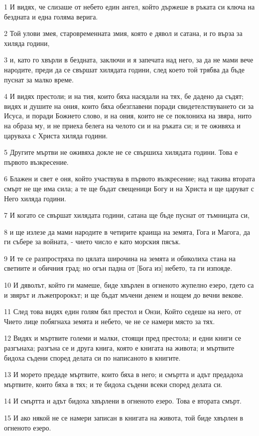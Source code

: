 \par 1 И видях, че слизаше от небето един ангел, който държеше в ръката си ключа на бездната и една голяма верига.
\par 2 Той улови змея, старовременната змия, която е дявол и сатана, и го върза за хиляда години,
\par 3 и, като го хвърли в бездната, заключи и я запечата над него, за да не мами вече народите, преди да се свършат хилядата години, след което той трябва да бъде пуснат за малко време.
\par 4 И видях престоли; и на тия, които бяха насядали на тях, бе дадено да съдят; видях и душите на ония, които бяха обезглавени поради свидетелствуването си за Исуса, и поради Божието слово, и на ония, които не се поклониха на звяра, нито на образа му, и не приеха белега на челото си и на ръката си; и те оживяха и царуваха с Христа хиляда години.
\par 5 Другите мъртви не оживяха докле не се свършиха хилядата години. Това е първото възкресение.
\par 6 Блажен и свет е оня, който участвува в първото възкресение; над такива втората смърт не ще има сила; а те ще бъдат свещеници Богу и на Христа и ще царуват с Него хиляда години.
\par 7 И когато се свършат хилядата години, сатана ще бъде пуснат от тъмницата си,
\par 8 и ще излезе да мами народите в четирите краища на земята, Гога и Магога, да ги събере за войната, - чието число е като морския пясък.
\par 9 И те се разпростряха по цялата широчина на земята и обиколиха стана на светиите и обичния град; но огън падна от [Бога из] небето, та ги изпояде.
\par 10 И дяволът, който ги мамеше, биде хвърлен в огненото жупелно езеро, гдето са и звярът и лъжепророкът; и ще бъдат мъчени денем и нощем до вечни векове.
\par 11 След това видях един голям бял престол и Онзи, Който седеше на него, от Чието лице побягнаха земята и небето, че не се намери място за тях.
\par 12 Видях и мъртвите големи и малки, стоящи пред престола; и едни книги се разгънаха; разгъна се и друга книга, която е книгата на живота; и мъртвите бидоха съдени според делата си по написаното в книгите.
\par 13 И морето предаде мъртвите, които бяха в него; и смъртта и адът предадоха мъртвите, които бяха в тях; и те бидоха съдени всеки според делата си.
\par 14 И смъртта и адът бидоха хвърлени в огненото езеро. Това е втората смърт.
\par 15 И ако някой не се намери записан в книгата на живота, той биде хвърлен в огненото езеро.

